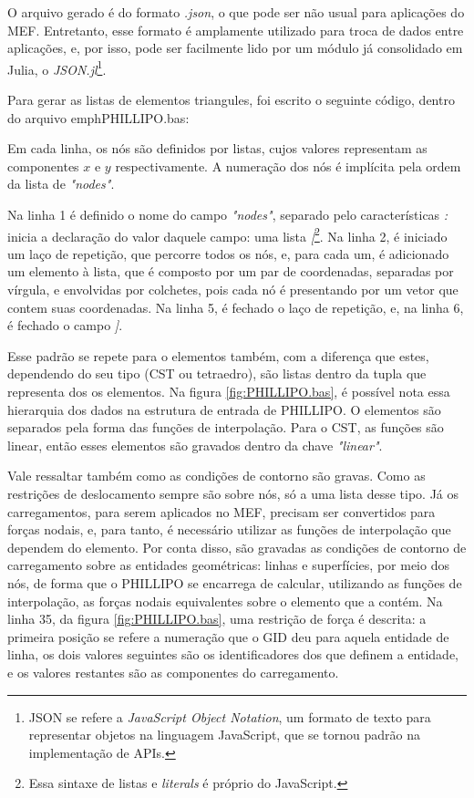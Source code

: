O arquivo gerado é do formato \emph{.json}, o que pode ser não usual para aplicações do MEF. Entretanto, esse formato é amplamente utilizado para troca de dados entre aplicações, e, por isso, pode ser facilmente lido por um módulo já consolidado em Julia, o \emph{JSON.jl}\footnote{JSON se refere a \emph{JavaScript Object Notation}, um formato de texto para representar objetos na linguagem JavaScript, que se tornou padrão na implementação de APIs.}. 

Para gerar as listas de elementos triangules, foi escrito o seguinte código, dentro do arquivo emph{PHILLIPO.bas}:

Em cada linha, os nós são definidos por listas, cujos valores representam as componentes $x$ e $y$ respectivamente. A numeração dos nós é implícita pela ordem da lista de \emph{"nodes"}.

Na linha 1 é definido o nome do campo \emph{"nodes"}, separado pelo características \emph{:} inicia a declaração do valor daquele campo: uma lista \emph{[}\footnote{Essa sintaxe de listas e \emph{literals} é próprio do JavaScript.}. Na linha 2, é iniciado um laço de repetição, que percorre todos os nós, e, para cada um, é adicionado um elemento à lista, que é composto por um par de coordenadas, separadas por vírgula, e envolvidas por colchetes, pois cada nó é presentando por um vetor que contem suas coordenadas. Na linha 5, é fechado o laço de repetição, e, na linha 6, é fechado o campo \emph{]}. 

Esse padrão se repete para o elementos também, com a diferença que estes, dependendo do seu tipo (CST ou tetraedro), são listas dentro da tupla que representa dos os elementos. Na figura \ref{fig:PHILLIPO.bas}, é possível nota essa hierarquia dos dados na estrutura de entrada de PHILLIPO. O elementos são separados pela forma das funções de interpolação. Para o CST, as funções são linear, então esses elementos são gravados dentro da chave \emph{"linear"}. 

Vale ressaltar também como as condições de contorno são gravas. Como as restrições de deslocamento sempre são sobre nós, só a uma lista desse tipo. Já os carregamentos, para serem aplicados no MEF, precisam ser convertidos para forças nodais, e, para tanto, é necessário utilizar as funções de interpolação que dependem do elemento. Por conta disso, são gravadas as condições de contorno de carregamento sobre as entidades geométricas: linhas e superfícies, por meio dos nós, de forma que o PHILLIPO se encarrega de calcular, utilizando as funções de interpolação, as forças nodais equivalentes sobre o elemento que a contém. Na linha 35, da figura \ref{fig:PHILLIPO.bas}, uma restrição de força é descrita: a primeira posição se refere a numeração que o GID deu para aquela entidade de linha, os dois valores seguintes são os identificadores dos que definem a entidade, e os valores restantes são as componentes do carregamento.

